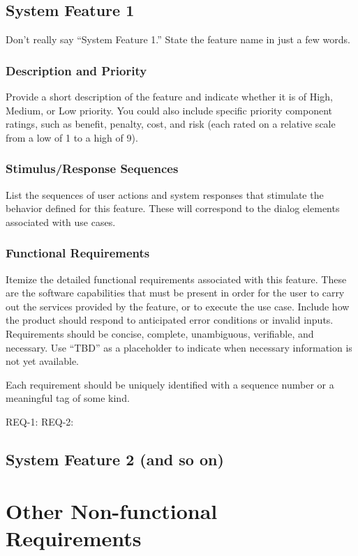 \documentclass[a4paper,10pt]{article}
\begin{document}
\subsection{System Feature 1}

Don’t really say “System Feature 1.” State the feature name in just a few words.
\subsubsection{Description and Priority}
Provide a short description of the feature and indicate whether it is of High, Medium, or Low priority. You could also include specific priority component ratings, such as benefit, penalty, cost, and risk (each rated on a relative scale from a low of 1 to a high of 9).
\subsubsection{Stimulus/Response Sequences}
List the sequences of user actions and system responses that stimulate the behavior defined for this feature. These will correspond to the dialog elements associated with use cases.
\subsubsection{Functional Requirements}
Itemize the detailed functional requirements associated with this feature. These are the software capabilities that must be present in order for the user to carry out the services provided by the feature, or to execute the use case. Include how the product should respond to anticipated error conditions or invalid inputs. Requirements should be concise, complete, unambiguous, verifiable, and necessary. Use “TBD” as a placeholder to indicate when necessary information is not yet available.

Each requirement should be uniquely identified with a sequence number or a meaningful tag of some kind.

REQ-1:
REQ-2:
\subsection{System Feature 2 (and so on)}

\section{Other Non-functional Requirements}
\end{document}
